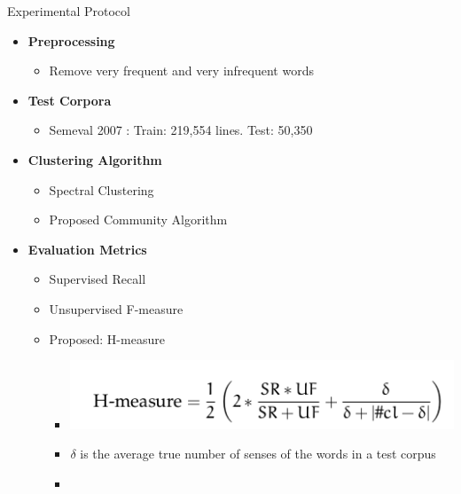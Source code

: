 \documentclass[10pt,xcolor=table]{beamer}
\begin{document}
\begin{frame}{Experimental Protocol}
	\begin{itemize}
		\item \large \textbf{Preprocessing}
			\begin{itemize}
				\item Remove very frequent and very infrequent words
			\end{itemize}
		\item \textbf{Test Corpora}
			\begin{itemize}
			\item Semeval 2007 \cite{SangM03}: Train: 219,554 lines. Test: 50,350 
			\end{itemize}
		\item \textbf{Clustering Algorithm}
			\begin{itemize}
				\item Spectral Clustering \cite{Shi2000}
				\item Proposed Community Algorithm
			\end{itemize}

		\item \textbf{Evaluation Metrics}
			\begin{itemize}
				\item Supervised Recall
				\item Unsupervised  F-measure
				\item Proposed: H-measure
				\begin{itemize}
				\item[] \includegraphics[width=0.6\linewidth]{image2/Chapitre4/h-measure}
				\item[] \small $\delta$ is the average true number of senses of the words in a test corpus

				\end{itemize}
				\begin{itemize}
					\item[] 
				\end{itemize}
			\end{itemize}
	\end{itemize}	 
	\vspace{\textheight}
\end{frame}
\end{document}
